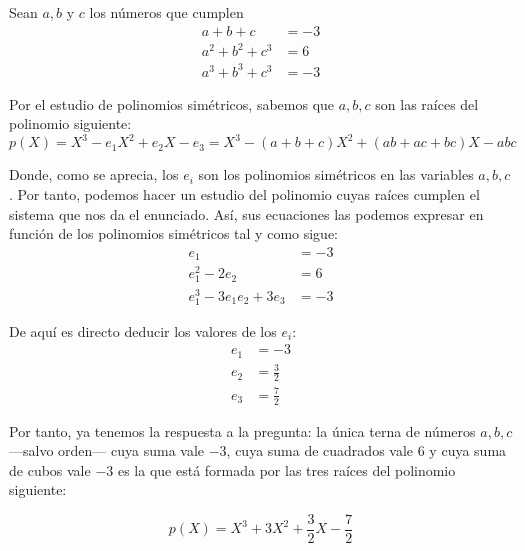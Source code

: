 \documentclass[a4paper, 11pt]{article}
\begin{document}
  \begin{ejercicio}
  \end{ejercicio}

  \begin{solucion}
      Sean $a,b$ y $c$ los números que cumplen
      \begin{align*}
          a+b+c &= -3 \\
          a^2+b^2+c^3 &= 6 \\
          a^3+b^3+c^3 &= -3
      \end{align*}

      Por el estudio de polinomios simétricos, sabemos que $a,b,c$ son las raíces del polinomio siguiente:
      \[
      p(X) = X^3 -e_1 X^2 + e_2 X - e_3 = X^3 - (a+b+c) X^2 + (ab+ac+bc) X - abc
      \]

      Donde, como se aprecia, los $e_i$ son los polinomios simétricos en las variables $a,b,c$. Por tanto, podemos hacer un estudio del polinomio cuyas raíces cumplen el sistema que nos da el enunciado. Así, sus ecuaciones las podemos expresar en función de los polinomios simétricos tal y como sigue:
      \begin{align*}
          e_1 &= -3 \\
          e_1^2-2e_2 &= 6 \\
          e_1^3 -3e_1e_2 +3e_3 &= -3
      \end{align*}

      De aquí es directo deducir los valores de los $e_i$:
      \begin{align*}
          e_1 &= -3 \\
          e_2 &= \frac{3}{2} \\
          e_3 &= \frac{7}{2}
      \end{align*}

      Por tanto, ya tenemos la respuesta a la pregunta: la única terna de números $a,b,c$ ---salvo orden--- cuya suma vale $-3$, cuya suma de cuadrados vale $6$ y cuya suma de cubos vale $-3$ es la que está formada por las tres raíces del polinomio siguiente:

      \[
      \boxed{p(X) = X^3 +3X^2 + \frac{3}{2}X - \frac{7}{2}}
      \]
  \end{solucion}

  \begin{ejercicio}
  \end{ejercicio}
\end{document}
